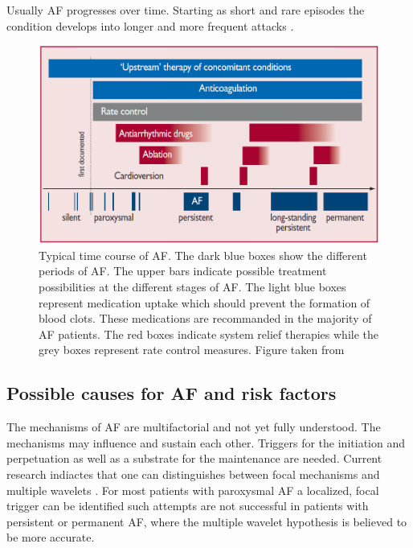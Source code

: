 \documentclass[type=dr, dr=rernat, accentcolor=tud7b,colorbacktitle, bigchapter, openright, twoside, 12pt ]{tudthesis}
\begin{document}
Usually AF progresses over time. Starting as short and rare episodes the condition develops into longer and more frequent attacks \cite{ESC10}. 

\begin{figure}[H]
\begin{center}
\includegraphics[scale=0.3]{af_over_time.png}
\caption{Typical time course of AF. The dark blue boxes show the different periods of AF. The upper bars indicate possible treatment possibilities at the different stages of AF. The light blue boxes represent medication uptake which should prevent the formation of blood clots. These medications are recommanded in the majority of AF patients. The red boxes indicate system relief therapies while the grey boxes represent rate control measures. Figure taken from \cite{ESC10}}
\label{afovertime}
\end{center}
\end{figure}



\subsection*{Possible causes for AF and risk factors}

The mechanisms of AF are multifactorial and not yet fully understood. The mechanisms may influence and sustain each other. Triggers for the initiation and perpetuation as well as a substrate for the maintenance are needed. Current research indiactes that one can distinguishes between focal mechanisms and multiple wavelets \cite{CE09}. For most patients with paroxysmal AF a localized, focal trigger can be identified such attempts are not successful in patients with persistent or permanent AF, where the multiple wavelet hypothesis is believed to be more accurate.\newline
\end{document}
